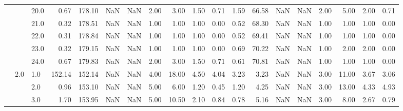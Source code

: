 \begin{tabular}{lllrrrrrrrrrrrrrrrr}
       &     & 20.0 &      0.67 &     178.10 &               NaN &                NaN &  2.00 &   3.00 &             1.50 &                         0.71 &      1.59 &      66.58 &               NaN &                NaN &  2.00 &   5.00 &             2.00 &                         0.71 \\
       &     & 21.0 &      0.32 &     178.51 &               NaN &                NaN &  1.00 &   1.00 &             1.00 &                         0.00 &      0.52 &      68.30 &               NaN &                NaN &  1.00 &   1.00 &             1.00 &                         0.00 \\
       &     & 22.0 &      0.31 &     178.84 &               NaN &                NaN &  1.00 &   1.00 &             1.00 &                         0.00 &      0.52 &      69.41 &               NaN &                NaN &  1.00 &   1.00 &             1.00 &                         0.00 \\
       &     & 23.0 &      0.32 &     179.15 &               NaN &                NaN &  1.00 &   1.00 &             1.00 &                         0.00 &      0.69 &      70.22 &               NaN &                NaN &  1.00 &   2.00 &             2.00 &                         0.00 \\
       &     & 24.0 &      0.67 &     179.83 &               NaN &                NaN &  2.00 &   3.00 &             1.50 &                         0.71 &      0.61 &      70.81 &               NaN &                NaN &  1.00 &   1.00 &             1.00 &                         0.00 \\
       & 2.0 & 1.0  &    152.14 &     152.14 &               NaN &                NaN &  4.00 &  18.00 &             4.50 &                         4.04 &      3.23 &       3.23 &               NaN &                NaN &  3.00 &  11.00 &             3.67 &                         3.06 \\
       &     & 2.0  &      0.96 &     153.10 &               NaN &                NaN &  5.00 &   6.00 &             1.20 &                         0.45 &      1.20 &       4.25 &               NaN &                NaN &  3.00 &  13.00 &             4.33 &                         4.93 \\
       &     & 3.0  &      1.70 &     153.95 &               NaN &                NaN &  5.00 &  10.50 &             2.10 &                         0.84 &      0.78 &       5.16 &               NaN &                NaN &  3.00 &   8.00 &             2.67 &                         0.79 \\

\end{tabular}
